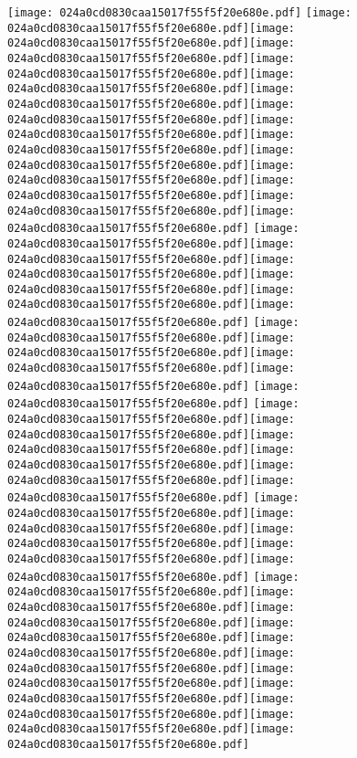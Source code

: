 \documentclass{article}
\newcommand{\origpg}[2]{\texttt{[image: 024a0cd0830caa15017f55f5f20e680e.pdf]}}
\begin{document}
{\vspace{21.199pt}\hspace{18.094pt}\origpg4{103.4pt 417.12pt 110.82pt 433.26pt}  \origpg4{125.56pt 417.12pt 136.32pt 433.26pt}\origpg4{136.39pt 417.12pt 142.76pt 433.26pt}\hspace{-0.113pt}\origpg4{142.65pt 417.12pt 149.82pt 433.26pt}\origpg4{149.87pt 417.12pt 158.5pt 433.26pt}\origpg4{158.5pt 417.12pt 168.72pt 433.26pt}\origpg4{168.65pt 417.12pt 176.72pt 433.26pt}\hspace{-0.597pt}\origpg4{176.13pt 417.12pt 184.34pt 433.26pt}\origpg4{184.34pt 417.12pt 191.51pt 433.26pt}\hspace{-0.21pt}\origpg4{191.3pt 417.12pt 199.93pt 433.26pt}\origpg4{199.93pt 417.12pt 207.1pt 433.26pt}\origpg4{207.18pt 417.12pt 214.23pt 433.26pt}\origpg4{214.17pt 417.12pt 221.79pt 433.26pt}\hspace{-0.145pt}\origpg4{221.64pt 417.12pt 230.28pt 433.26pt}\origpg4{230.28pt 417.12pt 237.44pt 433.26pt} \origpg4{246.68pt 417.12pt 254.79pt 433.26pt}\origpg4{254.84pt 417.12pt 262.01pt 433.26pt}\hspace{-0.178pt}\origpg4{261.83pt 417.12pt 269pt 433.26pt}\origpg4{269.05pt 417.12pt 276.1pt 433.26pt}\origpg4{276.04pt 417.12pt 284.67pt 433.26pt}\origpg4{284.67pt 417.12pt 293.31pt 433.26pt} \origpg4{302.75pt 417.12pt 310.96pt 433.26pt}\hspace{-0.258pt}\origpg4{310.7pt 417.12pt 318.77pt 433.26pt}\hspace{-0.113pt}\origpg4{318.66pt 417.12pt 326.73pt 433.26pt}\hspace{-0.355pt}\origpg4{326.38pt 417.12pt 332.99pt 433.26pt} \origpg4{342.26pt 417.12pt 349.43pt 433.26pt} \origpg4{358.85pt 417.12pt 367.07pt 433.26pt}\origpg4{367.07pt 417.12pt 375.14pt 433.26pt}\hspace{-0.145pt}\origpg4{374.99pt 417.12pt 383.06pt 433.26pt}\hspace{-0.355pt}\origpg4{382.71pt 417.12pt 389.32pt 433.26pt}\hspace{-0.355pt}\origpg4{388.97pt 417.12pt 397.04pt 433.26pt}\hspace{-0.355pt}\origpg4{396.68pt 417.12pt 406.9pt 433.26pt} \origpg4{416.18pt 417.12pt 426.4pt 433.26pt}\origpg4{426.3pt 417.12pt 434.37pt 433.26pt}\hspace{-0.597pt}\origpg4{433.77pt 417.12pt 444.93pt 433.26pt}\origpg4{444.86pt 417.12pt 452.03pt 433.26pt}\hspace{-0.178pt}\origpg4{451.85pt 417.12pt 458.9pt 433.26pt} \origpg4{468.22pt 417.12pt 476.85pt 433.26pt}\origpg4{476.85pt 417.12pt 484.92pt 433.26pt}\hspace{0.145pt}\origpg4{485.07pt 417.12pt 493.14pt 433.26pt}\hspace{-0.113pt}\origpg4{493.03pt 417.12pt 501.66pt 433.26pt}\origpg4{501.66pt 417.12pt 508.83pt 433.26pt}\hspace{-0.145pt}\origpg4{508.68pt 417.12pt 516.75pt 433.26pt}\hspace{-0.839pt}\origpg4{515.91pt 417.12pt 523.98pt 433.26pt}\hspace{-0.597pt}\origpg4{523.39pt 417.12pt 531.6pt 433.26pt}\origpg4{531.6pt 417.12pt 540.24pt 433.26pt}\origpg4{540.24pt 417.12pt 547.29pt 433.26pt}\origpg4{547.24pt 417.12pt 554.6pt 433.26pt} 

}
\end{document}
